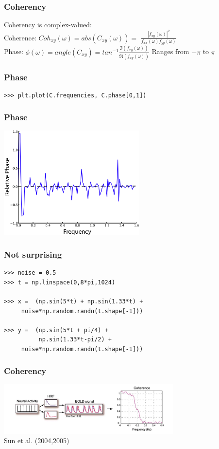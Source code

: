 \documentclass{beamer}
\begin{document}
\begin{frame}
\frametitle{Coherency}
Coherency is complex-valued:
\\
\vfill
Coherence: $Coh_{xy} (\omega) = abs(C_{xy}(\omega)) = $
$\frac{|f_{xy}(\omega)|^2}{f_{xx}(\omega)f_{yy}(\omega)}$
\\
\pause
\vfill
Phase: $\phi(\omega)= angle(C_{xy}) =
tan^{-1}\frac{\Im(f_{xy}(\omega))}{\Re(f_{xy}(\omega))}$
\vfill
\pause
Ranges from $-\pi$ to $\pi$
\end{frame}

\begin{frame}[fragile]
\frametitle{Phase}
\begin{lstlisting}
>>> plt.plot(C.frequencies, C.phase[0,1])
\end{lstlisting}
\end{frame}

\begin{frame}
\frametitle{Phase}
\includegraphics[height=5.7cm]{figures/outa_phase_tseries_ph}
\end{frame}


\begin{frame}[fragile]
\frametitle{Not surprising}
\begin{lstlisting}
>>> noise = 0.5
>>> t = np.linspace(0,8*pi,1024) 

>>> x =  (np.sin(5*t) + np.sin(1.33*t) +  
     noise*np.random.randn(t.shape[-1]))

>>> y =  (np.sin(5*t + pi/4) + 
          np.sin(1.33*t-pi/2) +
     noise*np.random.randn(t.shape[-1]))
\end{lstlisting}
\end{frame}

\begin{frame}
\frametitle{Coherency}
\includegraphics[height=2.7cm]{figures/tseries_w_hemo_w_coh}
\\
\hfill
Sun et al. (2004,2005)
\end{frame}
\end{document}
